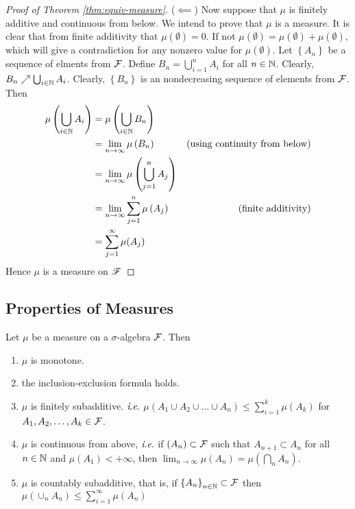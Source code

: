 \begin{proof}[Proof of Theorem \ref{thm:equiv-measure}]
    ($\impliedby$) Now suppose that $\mu$ is finitely additive and continuous from below.
    We intend to prove that $\mu$ is a measure. It is clear that from finite additivity that $\mu \left( \emptyset \right) = 0$. If not $\mu \left( \emptyset \right) = \mu \left( \emptyset \right) + \mu\left( \emptyset \right)$, which will give a contradiction for any nonzero value for $\mu \left( \emptyset \right)$. Let $\left\{ A_n \right\}$ be a sequence of elments from ${\cal F}$. Define $B_n = \bigcup_{i=1}^{n} A_i$ for all $n\in \mathbb N$. Clearly, $B_n \nearrow \bigcup_{i \in \mathbb N} A_i$. Clearly, $\left\{ B_n \right\}$ is an nondecreasing sequence of elements from ${\cal F}$. Then
    \begin{align*}
        \mu \left( \bigcup_{i \in \mathbb N} A_i \right) &= \mu \left( \bigcup_{i \in \mathbb N} B_n \right) &\\
        &= \lim_{n \to \infty} \mu\left( B_n \right) & \text{(using continuity from below)} \\
        &= \lim_{n \to \infty} \mu \left( \bigcup_{j=1}^{n} A_j \right) & \\
        &= \lim_{n \to \infty} \sum_{j=1}^{n} \mu \left( A_j \right) & \text{(finite additivity)} \\
        &= \sum_{j=1}^{\infty} \mu (A_j) 
    \end{align*}
    Hence $\mu$ is a measure on ${\mathscr F}$
\end{proof}



\subsection{Properties of Measures}

\begin{theorem}
    \label{thm:prop-measures}
    Let $\mu$ be a measure on a $\sigma$-algebra ${\cal F}$. Then
    \begin{enumerate}[label=(\arabic*)]
	    \item $\mu$ is monotone.
	    \item the inclusion-exclusion formula holds.
	    \item $\mu$ is finitely subadditive. $\textit{i}.\textit{e}.$ $\mu \left( A_1 \cup A_2 \cup \ldots \cup A_n \right) \le \sum_{i=1}^{k} \mu (A_k)$ for $A_1, A_2, \ldots , A_k \in {\cal F}	$.
	    \item $\mu$ is continuous from above, $\textit{i}.\textit{e}.$ if $\left( A_n \right) \subset {\cal F}$ such that $A_{n+1} \subset A_{n}$ for all $n\in\mathbb N$ and $\mu (A_{1}) < +\infty$, then $\lim_{n \to \infty} \mu(A_n) = \mu \left( \bigcap_n A_n \right)$.
	    \item $\mu$ is countably subadditive, that is, if $\left\{ A_n \right\}_{n\in \mathbb N}\subset {\cal F}$ then $\mu \left(\cup_n A_n \right) \le \sum_{i=1}^{\infty} \mu \left( A_n \right)$
    \end{enumerate}
\end{theorem}

